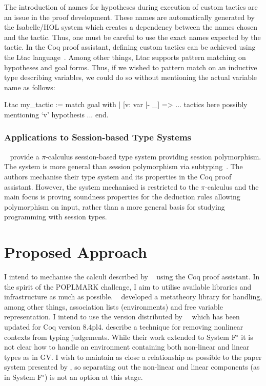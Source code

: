 \documentclass{mprop}
\newcommand{\fpop}{System F${}^\circ$\xspace}
\begin{document}
The introduction of names for hypotheses during execution of custom tactics are an issue in the proof development. These names are automatically generated by the Isabelle/HOL system which creates a dependency between the names chosen and the tactic. Thus, one must be careful to use the exact names expected by the tactic. In the Coq proof assistant, defining custom tactics can be achieved using the Ltac language~\cite{Delahaye:2000:TLS}. Among other things, Ltac supports pattern matching on hypotheses and goal forms. Thus, if we wished to pattern match on an inductive type describing variables, we could do so without mentioning the actual variable name as follows:

\begin{coq}
Ltac my_tactic :=
  match goal with
  | [v: var |- _] => ... tactics here possibly mentioning `v' hypothesis ...
  end.
\end{coq}

\subsubsection{Applications to Session-based Type Systems}\label{sec:asts}

\citeauthor{Goto:2014}~\cite{Goto:2014} provide a $\pi$-calculus session-based type system providing session polymorphism. The system is more general than session polymorphism via subtyping~\cite{Gay:2005:SST}. The authors mechanise their type system and its properties in the Coq proof assistant. However, the system mechanised is restricted to the $\pi$-calculus and the main focus is proving soundness properties for the deduction rules allowing polymorphism on input, rather than a more general basis for studying programming with session types.

\section{Proposed Approach}\label{sec:approach}


I intend to mechanise the calculi described by \citeauthor{Wadler:2012}~\cite{Wadler:2012} using the Coq proof assistant. In the spirit of the POPLMARK challenge, I aim to utilise available libraries and infrastructure as much as possible. \citeauthor{Aydemir:2008:EFM}~\cite{Aydemir:2008:EFM} developed a metatheory library for handling, among other things, association lists (environments) and free variable representation. I intend to use the version distributed by~\citeauthor{Park:2014:MMW}~\cite{Park:2014:MMW} which has been updated for Coq version 8.4pl4. \citeauthor{Park:2014:MMW} describe a technique for removing nonlinear contexts from typing judgements. While their work extended to \fpop it is not clear how to handle an environment containing both non-linear and linear types as in GV. I wish to maintain as close a relationship as possible to the paper system presented by \citeauthor{Wadler:2012}, so separating out the non-linear and linear components (as in \fpop) is not an option at this stage.
\end{document}
